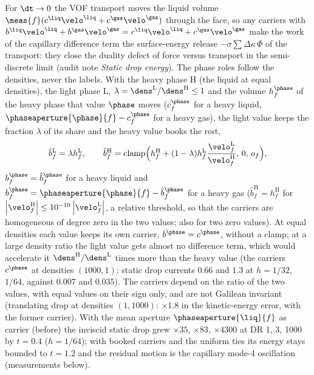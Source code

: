For $\dt\to0$ the VOF transport moves the liquid volume
$\meas{f}(c^{\liq}\velo^{\liq}+c^{\gas}\velo^{\gas})$ through the face, so any
carriers with $b^{\liq}\velo^{\liq}+b^{\gas}\velo^{\gas}=c^{\liq}\velo^{\liq}+c^{\gas}\velo^{\gas}$
make the work of the capillary difference term the surface-energy release
$-\sigma\sum\Delta\kappa\,\Phi$ of the transport: they close the duality
defect of force versus transport in the semi-discrete limit (audit note
\emph{Static drop energy}). The phase roles follow the densities, never the
labels. With the heavy phase $\mathrm H$ (the liquid at equal densities), the
light phase $\mathrm L$, $\lambda=\dens^{\mathrm L}/\dens^{\mathrm H}\le1$ and
the volume $h^{\phase}_f$ of the heavy phase that value $\phase$ moves
($c^{\phase}_f$ for a heavy liquid, $\phaseaperture{\phase}{f}-c^{\phase}_f$ for
a heavy gas), the light value keeps the fraction $\lambda$ of its share and the
heavy value books the rest,
\begin{equation}\label{eq:projection:mimetic-carriers}
  \hat b^{\mathrm L}_f=\lambda h^{\mathrm L}_f,\qquad
  \hat b^{\mathrm H}_f=\operatorname{clamp}\Bigl(h^{\mathrm H}_f+(1-\lambda)h^{\mathrm L}_f\frac{\velo^{\mathrm L}_f}{\velo^{\mathrm H}_f},\,0,\,o_f\Bigr),
\end{equation}
$b^{\phase}_f=\hat b^{\phase}_f$ for a heavy liquid and
$b^{\phase}_f=\phaseaperture{\phase}{f}-\hat b^{\phase}_f$ for a heavy gas
($\hat b^{\mathrm H}_f=h^{\mathrm H}_f$ for
$\abs{\velo^{\mathrm H}_f}\le10^{-10}\abs{\velo^{\mathrm L}_f}$, a relative threshold, so
that the carriers are homogeneous of degree zero in the two values; also for
two zero values). At equal densities each value keeps its own carrier,
$b^{\phase}=c^{\phase}$, without a clamp; at a large density ratio the light
value gets almost no difference term, which would accelerate it
$\dens^{\mathrm H}/\dens^{\mathrm L}$ times more than the heavy value (the
carriers $c^{\phase}$ at densities $(1000,1)$: static drop currents
$0.66$ and $1.3$ at $h=1/32$, $1/64$, against $0.007$ and $0.035$). The
carriers depend on the ratio of the two values, with equal values on their
sign only, and are not Galilean invariant (translating drop at densities
$(1,1000)$: $\times1.8$ in the kinetic-energy error, with the former carrier).
With the mean aperture $\phaseaperture{\liq}{f}$ as carrier (before) the
inviscid static drop grew $\times35$, $\times83$, $\times4300$ at DR 1, 3, 1000
by $t=0.4$ ($h=1/64$); with booked carriers and the uniform ties its energy
stays bounded to $t=1.2$ and the residual motion is the capillary mode-4
oscillation (measurements below).

